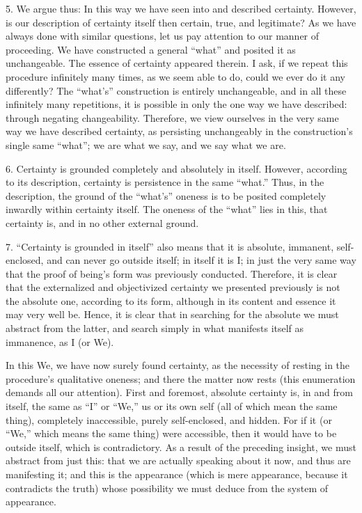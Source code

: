 5. We argue thus:
In this way we have seen into and described certainty.
However, is our description of certainty itself then
certain, true, and legitimate?
As we have always done with similar questions,
let us pay attention to our manner of proceeding.
We have constructed a general “what”
and posited it as unchangeable.
The essence of certainty appeared therein.
I ask, if we repeat this procedure infinitely many times,
as we seem able to do, could we ever do it any differently?
The “what's” construction is entirely unchangeable,
and in all these infinitely many repetitions,
it is possible in only the one way we have described:
through negating changeability.
Therefore, we view ourselves in the very same way
we have described certainty, as persisting unchangeably
in the construction's single same “what”;
we are what we say, and we say what we are.

6. Certainty is grounded completely and absolutely in itself.
However, according to its description,
certainty is persistence in the same “what.”
Thus, in the description, the ground of the “what's” oneness is
to be posited completely inwardly within certainty itself.
The oneness of the “what” lies in this,
that certainty is,
and in no other external ground.

7. “Certainty is grounded in itself” also means
that it is absolute, immanent, self-enclosed,
and can never go outside itself;
in itself it is I;
in just the very same way that
the proof of being's form was previously conducted.
Therefore, it is clear that the externalized and objectivized
certainty we presented previously is not
the absolute one, according to its form,
although in its content and essence it may very well be.
Hence, it is clear that in searching for the absolute
we must abstract from the latter,
and search simply in what manifests
itself as immanence, as I (or We).

In this We, we have now surely found certainty,
as the necessity of resting
in the procedure's qualitative oneness;
and there the matter now rests
(this enumeration demands all our attention).
First and foremost, absolute certainty is,
in and from itself,
the same as “I” or “We,”
us or its own self
(all of which mean the same thing),
completely inaccessible,
purely self-enclosed,
and hidden.
For if it
(or “We,” which means the same thing)
were accessible,
then it would have to be outside itself,
which is contradictory.
As a result of the preceding insight,
we must abstract from just this:
that we are actually speaking about it now,
and thus are manifesting it;
and this is the appearance
(which is mere appearance,
because it contradicts the truth)
whose possibility we must deduce
from the system of appearance.


